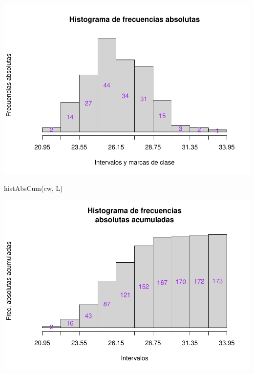 \documentclass[
]{article}
\newenvironment{Shaded}{\begin{snugshade}}{\end{snugshade}}
\newcommand{\FunctionTok}[1]{\textcolor[rgb]{0.00,0.00,0.00}{#1}}
\newcommand{\NormalTok}[1]{#1}
\begin{document}
\includegraphics{EstadisticosAgrupados_files/figure-latex/unnamed-chunk-7-2.pdf}

\begin{Shaded}
\begin{Highlighting}[]
\FunctionTok{histAbsCum}\NormalTok{(cw, L)}
\end{Highlighting}
\end{Shaded}

\includegraphics{EstadisticosAgrupados_files/figure-latex/unnamed-chunk-7-3.pdf}
\end{document}

